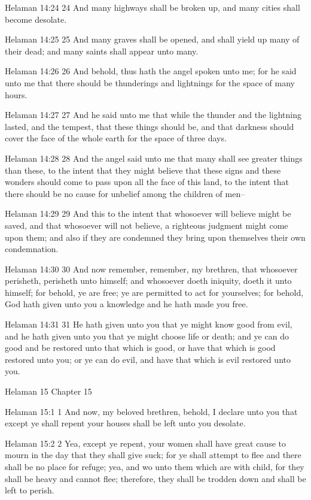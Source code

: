 Helaman 14:24
 24 And many highways shall be broken up, and many cities shall
become desolate.

Helaman 14:25
 25 And many graves shall be opened, and shall yield up many of
their dead; and many saints shall appear unto many.

Helaman 14:26
 26 And behold, thus hath the angel spoken unto me; for he said
unto me that there should be thunderings and lightnings for the
space of many hours.

Helaman 14:27
 27 And he said unto me that while the thunder and the lightning
lasted, and the tempest, that these things should be, and that
darkness should cover the face of the whole earth for the space
of three days.

Helaman 14:28
 28 And the angel said unto me that many shall see greater things
than these, to the intent that they might believe that these
signs and these wonders should come to pass upon all the face of
this land, to the intent that there should be no cause for
unbelief among the children of men--

Helaman 14:29
 29 And this to the intent that whosoever will believe might be
saved, and that whosoever will not believe, a righteous judgment
might come upon them; and also if they are condemned they bring
upon themselves their own condemnation.

Helaman 14:30
 30 And now remember, remember, my brethren, that whosoever
perisheth, perisheth unto himself; and whosoever doeth iniquity,
doeth it unto himself; for behold, ye are free; ye are permitted
to act for yourselves; for behold, God hath given unto you a
knowledge and he hath made you free.

Helaman 14:31
 31 He hath given unto you that ye might know good from evil, and
he hath given unto you that ye might choose life or death; and ye
can do good and be restored unto that which is good, or have that
which is good restored unto you; or ye can do evil, and have that
which is evil restored unto you.

Helaman 15
Chapter 15

Helaman 15:1
 1 And now, my beloved brethren, behold, I declare unto you that
except ye shall repent your houses shall be left unto you
desolate.

Helaman 15:2
 2 Yea, except ye repent, your women shall have great cause to
mourn in the day that they shall give suck; for ye shall attempt
to flee and there shall be no place for refuge; yea, and wo unto
them which are with child, for they shall be heavy and cannot
flee; therefore, they shall be trodden down and shall be left to
perish.

